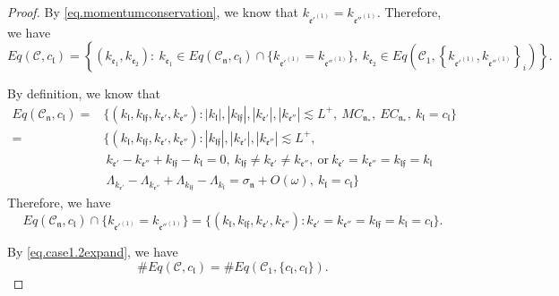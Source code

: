 \begin{proof}
By \eqref{eq.momentumconservation}, we know that $k_{\mathfrak{e}'^{(1)}}=k_{\mathfrak{e}''^{(1)}}$. Therefore, we have 
\begin{equation}\label{eq.case1.2expand}
    Eq(\mathcal{C},c_{\mathfrak{l}})=\left\{(k_{\mathfrak{e}_1},k_{\mathfrak{e}_{2}}):\ k_{\mathfrak{e}_1}\in Eq(\mathcal{C}_{\mathfrak{n}},c_{\mathfrak{l}})\cap \{k_{\mathfrak{e}'^{(1)}}=k_{\mathfrak{e}''^{(1)}}\},\  k_{\mathfrak{e}_{2}}\in Eq\left(\mathcal{C}_1, \left\{k_{\mathfrak{e}'^{(1)}}, k_{\mathfrak{e}''^{(1)}}\right\}_{i}\right)\right\}.
\end{equation}

By definition, we know that  
\begin{equation}
\begin{split}
    Eq(\mathcal{C}_{\mathfrak{n}},c_{\mathfrak{l}})=&\{(k_{\mathfrak{l}}, k_{\mathfrak{l}\mathfrak{f}}, k_{\mathfrak{e}'}, k_{\mathfrak{e}''}):  |k_{\mathfrak{l}}|, |k_{\mathfrak{l}\mathfrak{f}}|, |k_{\mathfrak{e}'}|, |k_{\mathfrak{e}''}| \lesssim L^+,\ MC_{\mathfrak{n}_*},\  EC_{\mathfrak{n}_*},\ k_{\mathfrak{l}}=c_{\mathfrak{l}}\}
    \\
    =&\{(k_{\mathfrak{l}}, k_{\mathfrak{l}\mathfrak{f}}, k_{\mathfrak{e}'}, k_{\mathfrak{e}''}):   |k_{\mathfrak{l}\mathfrak{f}}|, |k_{\mathfrak{e}'}|, |k_{\mathfrak{e}''}| \lesssim L^+,
    \\
    &\ k_{\mathfrak{e}'}-k_{\mathfrak{e}''}+k_{\mathfrak{l}\mathfrak{f}}-k_{\mathfrak{l}}=0,\ k_{\mathfrak{l}\mathfrak{f}}\ne k_{\mathfrak{e}'}\ne k_{\mathfrak{e}''},\ \text{or}\ k_{\mathfrak{e}'}= k_{\mathfrak{e}''}=k_{\mathfrak{l}\mathfrak{f}}=k_{\mathfrak{l}}
    \\
    &\  \Lambda_{k_{\mathfrak{e}'}}-\Lambda_{k_{\mathfrak{e}''}}+\Lambda_{k_{\mathfrak{l}\mathfrak{f}}}-\Lambda_{k_{\mathfrak{l}}} =\sigma_{\mathfrak{n}}+O(\omega),\ k_{\mathfrak{l}}=c_{\mathfrak{l}}\}
\end{split}
\end{equation}
Therefore, we have
\begin{equation}
    Eq(\mathcal{C}_{\mathfrak{n}},c_{\mathfrak{l}})\cap \{k_{\mathfrak{e}'^{(1)}}=k_{\mathfrak{e}''^{(1)}}\}=\{(k_{\mathfrak{l}}, k_{\mathfrak{l}\mathfrak{f}}, k_{\mathfrak{e}'}, k_{\mathfrak{e}''}):k_{\mathfrak{e}'}=k_{\mathfrak{e}''}=k_{\mathfrak{l}\mathfrak{f}}=k_{\mathfrak{l}}=c_{\mathfrak{l}}\}.
\end{equation}

By \eqref{eq.case1.2expand}, we have
\begin{equation}
    \#Eq(\mathcal{C},c_{\mathfrak{l}})=\#Eq(\mathcal{C}_1, \{c_{\mathfrak{l}}, c_{\mathfrak{l}}\}).
\end{equation}


\end{proof}
